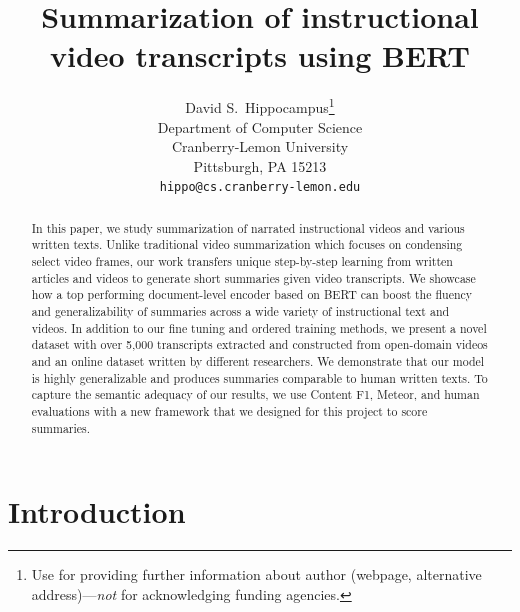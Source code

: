 \documentclass{article}
\title{Summarization of instructional video transcripts using BERT}
\author{%
  David S.~Hippocampus\thanks{Use  for providing further information
    about author (webpage, alternative address)---\emph{not} for acknowledging
    funding agencies.} \\
  Department of Computer Science\\
  Cranberry-Lemon University\\
  Pittsburgh, PA 15213 \\
  \texttt{hippo@cs.cranberry-lemon.edu} \\
}
\begin{document}
\maketitle

\begin{abstract}
In this paper, we study summarization of narrated instructional videos and various written texts. Unlike traditional video summarization which focuses on condensing select video frames, our work transfers unique step-by-step learning from written articles and videos to generate short summaries given video transcripts. We showcase how a top performing document-level encoder based on BERT can boost the fluency and generalizability of summaries across a wide variety of instructional text and videos. In addition to our fine tuning and ordered training methods, we present a novel dataset with over 5,000 transcripts extracted and constructed from open-domain videos and an online dataset written by different researchers. We demonstrate that our model is highly generalizable and produces summaries comparable to human written texts. To capture the semantic adequacy of our results, we use Content F1, Meteor, and human evaluations with a new framework that we designed for this project to score summaries.

\end{abstract}

\section{Introduction}
 
\end{document}
